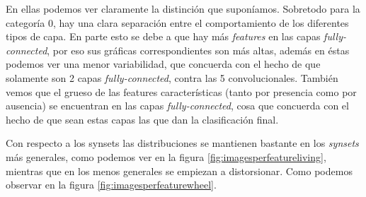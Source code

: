 \documentclass[12,twoside]{TFG-GM}
\theoremstyle{definition}
\theoremstyle{remark}
\begin{document}
En ellas podemos ver claramente la distinción que suponíamos. Sobretodo para la categoría 0, hay una clara separación entre el comportamiento de los diferentes tipos de capa. En parte esto se debe a que hay más \textit{features} en las capas \textit{fully-connected}, por eso sus gráficas correspondientes son más altas, además en éstas podemos ver una menor variabilidad, que concuerda con el hecho de que solamente son 2 capas \textit{fully-connected}, contra las 5 convolucionales. También vemos que el grueso de las features características (tanto por presencia como por ausencia) se encuentran en las capas \textit{fully-connected}, cosa que concuerda con el hecho de que sean estas capas las que dan la clasificación final. 
 
Con respecto a los synsets las distribuciones se mantienen bastante en los \textit{synsets} más generales, como podemos ver en la figura \ref{fig:imagesperfeatureliving}, mientras que en los menos generales se empiezan a distorsionar. Como podemos observar en la figura \ref{fig:imagesperfeaturewheel}.
\end{document}
